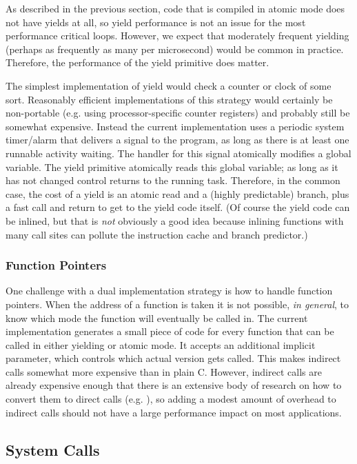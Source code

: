 \documentclass[acmsmall,anonymous,review]{acmart}\settopmatter{printfolios=true,printccs=false,printacmref=false}
\begin{document}
As described in the previous section, code that is compiled in atomic mode does not have yields at all, so yield performance is not an issue for the most performance critical loops.
However, we expect that moderately frequent yielding (perhaps as frequently as many per microsecond) would be common in practice.
Therefore, the performance of the yield primitive does matter.

The simplest implementation of yield would check a counter or clock of some sort.
Reasonably efficient implementations of this strategy would certainly be non-portable (e.g. using processor-specific counter registers) and probably still be somewhat expensive.
Instead the current \charcoal{} implementation uses a periodic system timer/alarm that delivers a signal to the program, as long as there is at least one runnable activity waiting.
The handler for this signal atomically modifies a global variable.
The yield primitive atomically reads this global variable; as long as it has not changed control returns to the running task.
Therefore, in the common case, the cost of a yield is an atomic read and a (highly predictable) branch, plus a fast call and return to get to the yield code itself.
(Of course the yield code can be inlined, but that is \emph{not} obviously a good idea because inlining functions with many call sites can pollute the instruction cache and branch predictor.)

\subsubsection{Function Pointers}

One challenge with a dual implementation strategy is how to handle function pointers.
When the address of a function is taken it is not possible, \emph{in general}, to know which mode the function will eventually be called in.
The current implementation generates a small piece of code for every function that can be called in either yielding or atomic mode.
It accepts an additional implicit parameter, which controls which actual version gets called.
This makes indirect calls somewhat more expensive than in plain C.
However, indirect calls are already expensive enough that there is an extensive body of research on how to convert them to direct calls (e.g. \cite{Dean1995}), so adding a modest amount of overhead to indirect calls should not have a large performance impact on most applications.

\subsection{System Calls}
\end{document}
